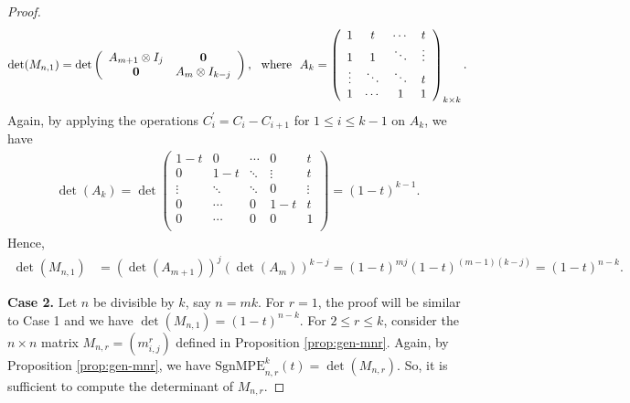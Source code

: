 \documentclass[12pt]{article}
\newcommand{\SMPE}{\mathrm{SgnMPE}}
\begin{document}
\begin{proof}
\begin{align*}
\det(M_{n,1})=\det\left(
 	\begin{array}{cc}
 	A_{m+1}\otimes I_j & \bf{0}\\
     \bf{0} &  {A_{m}}\otimes I_{k-j}  
 	\end{array}
 	\right),~~\text{where}~~
  A_k= \left(
 	\begin{array}{cccc}
 	1 & t &  \cdots & t \\
 	1 & 1 &  \ddots & \vdots \\
 	\vdots & \ddots & \ddots & t \\
 	1 & \cdots & 1 & 1 \\
 	\end{array}
 	\right)_{k\times k}.
\end{align*}
Again, by applying the operations $C_i^\prime=C_i-C_{i+1}$ for $1\leq i\leq k-1$ on $A_k$, we have 
\begin{align}\label{det:A_k}
 \det(A_k)=\det \left(
 	\begin{array}{ccccc}
 	1-t & 0 &  \cdots & 0 & t \\
 	0 & 1-t &  \ddots & \vdots & t \\
 	\vdots & \ddots & \ddots & 0 & \vdots\\
        0 & \cdots & 0 & 1-t & t \\
 	0 & \cdots & 0 &  0 & 1 \\
 	\end{array}
 	\right)=(1-t)^{k-1}.   
\end{align}
Hence,
\begin{align*} 
\det(M_{n,1}) & =(\det(A_{m+1}))^j (\det(A_{m}))^{k-j}=(1-t)^{mj}(1-t)^{(m-1)(k-j)}=(1-t)^{n-k}.
\end{align*} 


\noindent \textbf{Case 2.} Let $n$ be divisible by $k$, say $n=mk$. For $r=1$, the proof will be similar to Case 1 and we have $\det(M_{n,1})= (1-t)^{n-k}$. For $2 \leq r \leq k$, consider the $n \times n$ matrix $M_{n, r}= (m^r_{i, j})$ defined in Proposition \ref{prop:gen-mnr}. Again, by Proposition \ref{prop:gen-mnr}, we have $\SMPE_{n,r}^k(t)=\det(M_{n,r})$. So, it is sufficient to compute the determinant of $M_{n,r}$.


\end{proof}
\end{document}
